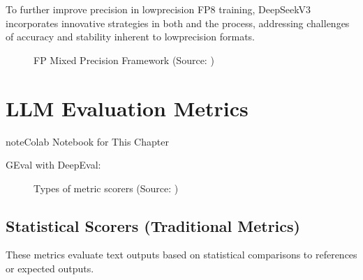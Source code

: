 \documentclass[letterpaper,11pt,english]{sphinxmanual}
\begin{document}
\begin{itemize}
\sphinxAtStartPar
To further improve precision in low\sphinxhyphen{}precision FP8 training,
DeepSeek\sphinxhyphen{}V3 incorporates innovative strategies in both
 and the  process, addressing
challenges of accuracy and stability inherent to low\sphinxhyphen{}precision
formats.

\begin{figure}[htbp]
\centering
\capstart

\noindent{}
\caption{FP Mixed Precision Framework (Source: )}\label{\detokenize{pretraining:id32}}\end{figure}

\end{itemize}

\sphinxstepscope


\chapter{LLM Evaluation Metrics}
\label{\detokenize{evaluation:llm-evaluation-metrics}}\label{\detokenize{evaluation:evaluation}}\label{\detokenize{evaluation::doc}}
\begin{sphinxadmonition}{note}{Colab Notebook for This Chapter}

\sphinxAtStartPar
GEval with DeepEval: 
\end{sphinxadmonition}

\begin{figure}[htbp]
\centering
\capstart

\noindent{}
\caption{Types of metric scorers (Source: )}\label{\detokenize{evaluation:id3}}\label{\detokenize{evaluation:fig-metrics-llm}}\end{figure}


\section{Statistical Scorers (Traditional Metrics)}
\label{\detokenize{evaluation:statistical-scorers-traditional-metrics}}
\sphinxAtStartPar
These metrics evaluate text outputs based on statistical comparisons to references
or expected outputs.
\end{document}
